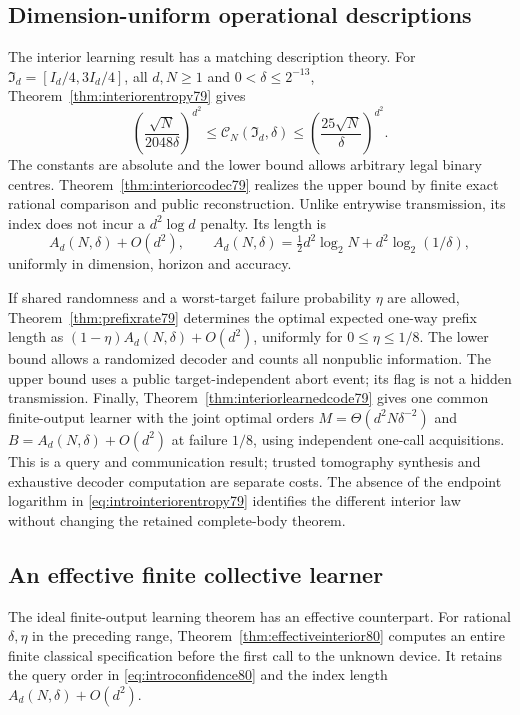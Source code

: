 \subsection{Dimension-uniform operational descriptions}
The interior learning result has a matching description theory.
For $\mathfrak I_d=[I_d/4,3I_d/4]$, all $d,N\ge1$ and
$0<\delta\le2^{-13}$, Theorem~\ref{thm:interiorentropy79} gives
\begin{equation}\label{eq:introinteriorentropy79}
 \left(\frac{\sqrt N}{2048\delta}\right)^{d^2}
 \le\mathcal C_N(\mathfrak I_d,\delta)
 \le\left(\frac{25\sqrt N}{\delta}\right)^{d^2}.
\end{equation}
The constants are absolute and the lower bound allows arbitrary
legal binary centres.  Theorem~\ref{thm:interiorcodec79} realizes
the upper bound by finite exact rational comparison and public
reconstruction.  Unlike entrywise transmission, its index does not
incur a $d^2\log d$ penalty.  Its length is
\[
 A_d(N,\delta)+O(d^2),\qquad
 A_d(N,\delta)=\tfrac12d^2\log_2N+d^2\log_2(1/\delta),
\]
uniformly in dimension, horizon and accuracy.

If shared randomness and a worst-target failure probability $\eta$
are allowed, Theorem~\ref{thm:prefixrate79} determines the optimal
expected one-way prefix length as
$(1-\eta)A_d(N,\delta)+O(d^2)$, uniformly for $0\le\eta\le1/8$.
The lower bound allows a randomized decoder and counts all nonpublic
information.  The upper bound uses a public target-independent
abort event; its flag is not a hidden transmission.
Finally, Theorem~\ref{thm:interiorlearnedcode79} gives one common
finite-output learner with the joint optimal orders
$M=\Theta(d^2N\delta^{-2})$ and $B=A_d(N,\delta)+O(d^2)$ at
failure $1/8$, using independent one-call acquisitions.  This is a
query and communication result; trusted tomography synthesis and
exhaustive decoder computation are separate costs.
The absence of the endpoint logarithm in
\eqref{eq:introinteriorentropy79} identifies the different interior
law without changing the retained complete-body theorem.

\subsection{An effective finite collective learner}
The ideal finite-output learning theorem has an effective counterpart.
For rational $\delta,\eta$ in the preceding range,
Theorem~\ref{thm:effectiveinterior80} computes an entire finite
classical specification before the first call to the unknown device.
It retains the query order in \eqref{eq:introconfidence80} and
the index length $A_d(N,\delta)+O(d^2)$.


